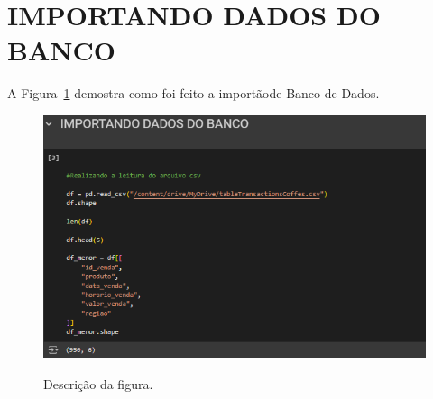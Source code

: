 \section{IMPORTANDO DADOS DO BANCO}
	\label{sec:identificao}
\label{sec:figura}
A Figura~\ref{figuras/figuras/configuraçao-importando-dados-banco.png} demostra como foi feito a importãode Banco de Dados.
\begin{figure}[!ht]
	{\centering
		\caption{Descrição da figura.}
		\includegraphics[width=1.0\textwidth]{figuras/configuraçao-importando-dados-banco.png}
		\label{figuras/figuras/configuraçao-importando-dados-banco.png}
	}
\end{figure} \\ \\ \\ \\ \\ \\ \\  \\ \\ \\ \\ \\ 

